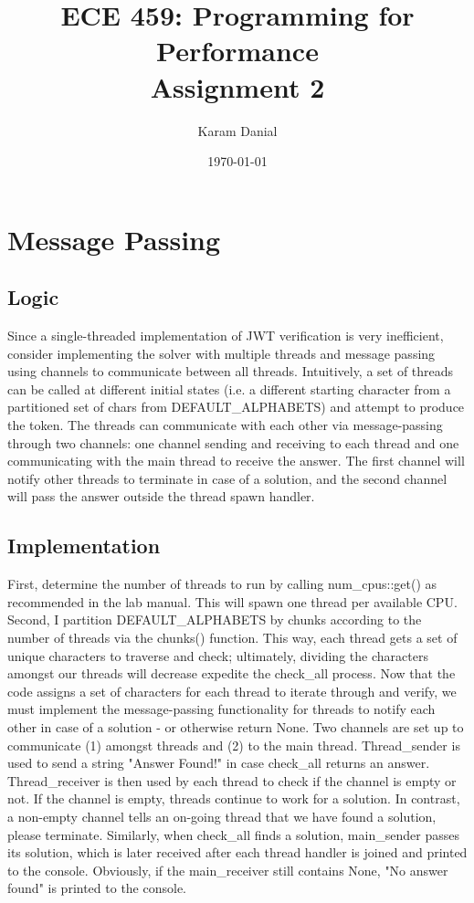 \documentclass[12pt]{article}
\title{ECE 459: Programming for Performance\\Assignment 2}
\author{Karam Danial}
\date{\today}
\begin{document}
\maketitle

\section{Message Passing}
\subsection{Logic}
\hspace{4mm} Since a single-threaded implementation of JWT verification is very inefficient, consider implementing the
solver with multiple threads and message passing using channels to communicate between all threads. Intuitively, a set
of threads can be called at different initial states (i.e. a different starting character from a partitioned set of chars
from DEFAULT\_ALPHABETS) and attempt to produce the token. The threads can communicate with each other via message-passing
through two channels: one channel sending and receiving to each thread and one communicating with the main thread to
receive the answer. The first channel will notify other threads to terminate in case of a solution, and the second channel
will pass the answer outside the thread spawn handler.

\subsection{Implementation}
\hspace{4mm} First, determine the number of threads to run by calling num\_cpus::get() as recommended in the lab manual.
This will spawn one thread per available CPU. Second, I partition DEFAULT\_ALPHABETS by chunks according to the number of
threads via the chunks() function. This way, each thread gets a set of unique characters to traverse and check; ultimately,
dividing the characters amongst our threads will decrease expedite the check\_all process. Now that the code assigns a set
of characters for each thread to iterate through and verify, we must implement the message-passing functionality for threads
to notify each other in case of a solution - or otherwise return None. Two channels are set up to communicate (1) amongst
threads and (2) to the main thread. Thread\_sender is used to send a string "Answer Found!" in case check\_all returns an
answer. Thread\_receiver is then used by each thread to check if the channel is empty or not. If the channel is empty,
threads continue to work for a solution. In contrast, a non-empty channel tells an on-going thread that we have found a
solution, please terminate. Similarly, when check\_all finds a solution, main\_sender passes its solution, which is later
received after each thread handler is joined and printed to the console. Obviously, if the main\_receiver still contains
None, "No answer found" is printed to the console.
\end{document}
